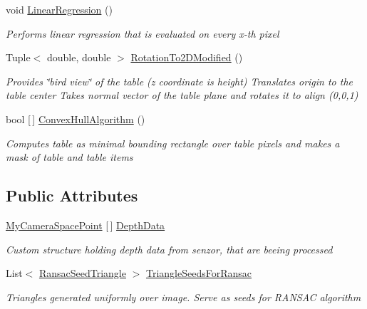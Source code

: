 \begin{DoxyCompactItemize}
void \mbox{\hyperlink{class_chess_tracking_1_1_image_processing_1_1_plane_algorithms_1_1_data_a37768ff592499abb76a2a8fb153a3455}{Linear\+Regression}} ()
\begin{DoxyCompactList}\small\item\em Performs linear regression that is evaluated on every x-\/th pixel \end{DoxyCompactList}\item 
Tuple$<$ double, double $>$ \mbox{\hyperlink{class_chess_tracking_1_1_image_processing_1_1_plane_algorithms_1_1_data_a83ebef6478b258f001e571201a4f145a}{Rotation\+To2\+D\+Modified}} ()
\begin{DoxyCompactList}\small\item\em Provides \char`\"{}bird view\char`\"{} of the table (z coordinate is height) Translates origin to the table center Takes normal vector of the table plane and rotates it to align (0,0,1) \end{DoxyCompactList}\item 
bool \mbox{[}$\,$\mbox{]} \mbox{\hyperlink{class_chess_tracking_1_1_image_processing_1_1_plane_algorithms_1_1_data_aba06dd63e5324838c6654e2e51b744b6}{Convex\+Hull\+Algorithm}} ()
\begin{DoxyCompactList}\small\item\em Computes table as minimal bounding rectangle over table pixels and makes a mask of table and table items \end{DoxyCompactList}\end{DoxyCompactItemize}
\subsection*{Public Attributes}
\begin{DoxyCompactItemize}
\item 
\mbox{\hyperlink{struct_chess_tracking_1_1_image_processing_1_1_plane_algorithms_1_1_my_camera_space_point}{My\+Camera\+Space\+Point}} \mbox{[}$\,$\mbox{]} \mbox{\hyperlink{class_chess_tracking_1_1_image_processing_1_1_plane_algorithms_1_1_data_aadb769b49d3275c69d22d87aa61a6e8a}{Depth\+Data}}
\begin{DoxyCompactList}\small\item\em Custom structure holding depth data from senzor, that are beeing processed \end{DoxyCompactList}\item 
List$<$ \mbox{\hyperlink{class_chess_tracking_1_1_image_processing_1_1_plane_algorithms_1_1_ransac_seed_triangle}{Ransac\+Seed\+Triangle}} $>$ \mbox{\hyperlink{class_chess_tracking_1_1_image_processing_1_1_plane_algorithms_1_1_data_ad9deed9c86fed79de5b12695c403e72b}{Triangle\+Seeds\+For\+Ransac}}
\begin{DoxyCompactList}\small\item\em Triangles generated uniformly over image. Serve as seeds for R\+A\+N\+S\+AC algorithm \end{DoxyCompactList}\end{DoxyCompactItemize}
